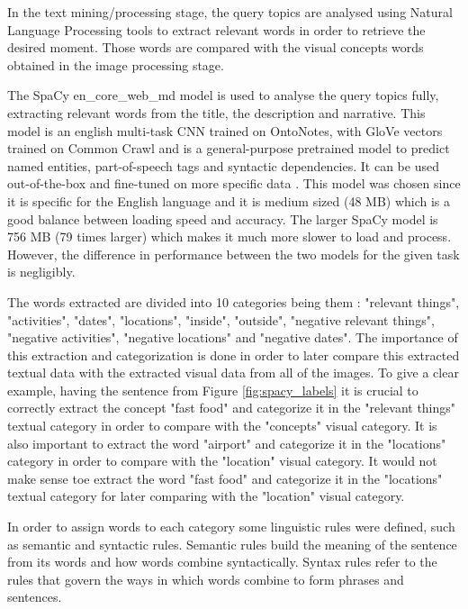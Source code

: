 In the text mining/processing stage, the query topics are analysed using Natural Language Processing tools to extract relevant words in order to retrieve the desired moment. Those words are compared with the visual concepts words obtained in the image processing stage. 

The SpaCy en\_core\_web\_md model \cite{Spacy2017} is used to analyse the query topics fully, extracting relevant words from the title, the description and narrative. This model is an english multi-task CNN trained on OntoNotes, with GloVe vectors trained on Common Crawl and is a general-purpose pretrained model to predict named entities, part-of-speech tags and syntactic dependencies. It can be used out-of-the-box and fine-tuned on more specific data \cite{Spacy2017}. This model was chosen since it is specific for the English language and it is medium sized (48 MB) which is a good balance between loading speed and accuracy. The larger SpaCy model is 756 MB (79 times larger) which makes it much more slower to load and process. However, the difference in performance between the two models for the given task is negligibly.




The words extracted are divided into 10 categories being them : "relevant things", "activities", "dates", "locations", "inside", "outside", "negative relevant things", "negative activities", "negative locations" and "negative dates". The importance of this extraction and categorization is done in order to later compare this extracted textual data with the extracted visual data from all of the images. To give a clear example, having the sentence from Figure \ref{fig:spacy_labels} it is crucial to correctly extract the concept "fast food" and categorize it in the "relevant things" textual category in order to compare with the "concepts" visual category. It is also important to extract the word "airport" and categorize it in the "locations" category in order to compare with the "location" visual category. It would not make sense toe extract the word "fast food" and categorize it in the "locations" textual category for later comparing with the "location" visual category.

In order to assign words to each category some linguistic rules were defined,
such as semantic and syntactic rules. Semantic rules build the meaning of the
sentence from its words and how words combine syntactically. Syntax rules refer to
the rules that govern the ways in which words combine to form phrases and
sentences. 


